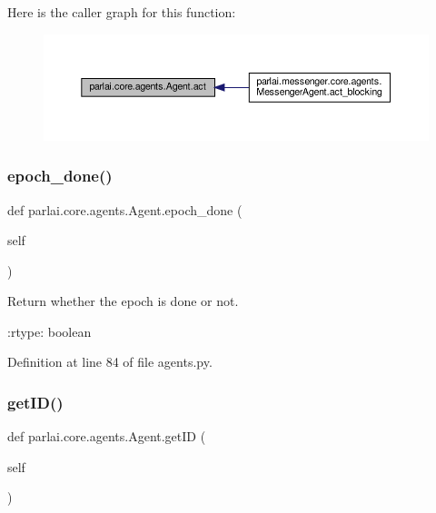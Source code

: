 Here is the caller graph for this function\+:
\nopagebreak
\begin{figure}[H]
\begin{center}
\leavevmode
\includegraphics[width=350pt]{classparlai_1_1core_1_1agents_1_1Agent_a6a8abe0a98dd59bc39c9f12b163072db_icgraph}
\end{center}
\end{figure}
\mbox{\label{classparlai_1_1core_1_1agents_1_1Agent_a40157e237ea85d75ebc3fd248c7a1a1b}} 
\subsubsection{\texorpdfstring{epoch\+\_\+done()}{epoch\_done()}}
{\footnotesize\ttfamily def parlai.\+core.\+agents.\+Agent.\+epoch\+\_\+done (\begin{DoxyParamCaption}\item[{}]{self }\end{DoxyParamCaption})}

\begin{DoxyVerb}Return whether the epoch is done or not.

:rtype: boolean
\end{DoxyVerb}
 

Definition at line 84 of file agents.\+py.

\mbox{\label{classparlai_1_1core_1_1agents_1_1Agent_a29e1cdd729ac4236f8bae90b2e66fa04}} 
\subsubsection{\texorpdfstring{get\+I\+D()}{getID()}}
{\footnotesize\ttfamily def parlai.\+core.\+agents.\+Agent.\+get\+ID (\begin{DoxyParamCaption}\item[{}]{self }\end{DoxyParamCaption})}

